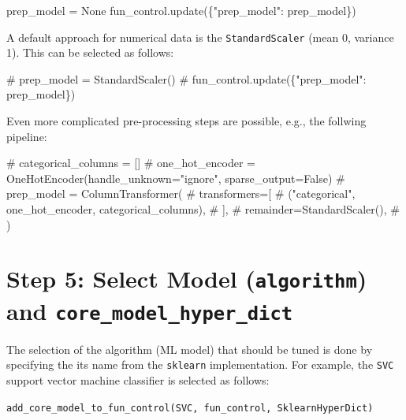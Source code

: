 \documentclass[
  letterpaper,
  DIV=11,
  numbers=noendperiod]{scrreprt}
\newenvironment{Shaded}{\begin{snugshade}}{\end{snugshade}}
\newcommand{\CommentTok}[1]{\textcolor[rgb]{0.37,0.37,0.37}{#1}}
\newcommand{\NormalTok}[1]{\textcolor[rgb]{0.00,0.23,0.31}{#1}}
\newcommand{\OperatorTok}[1]{\textcolor[rgb]{0.37,0.37,0.37}{#1}}
\newcommand{\StringTok}[1]{\textcolor[rgb]{0.13,0.47,0.30}{#1}}
\newcommand{\VariableTok}[1]{\textcolor[rgb]{0.07,0.07,0.07}{#1}}
\begin{document}
\begin{Shaded}
\begin{Highlighting}[]
\NormalTok{prep\_model }\OperatorTok{=} \VariableTok{None}
\NormalTok{fun\_control.update(\{}\StringTok{"prep\_model"}\NormalTok{: prep\_model\})}
\end{Highlighting}
\end{Shaded}

A default approach for numerical data is the \texttt{StandardScaler}
(mean 0, variance 1). This can be selected as follows:

\begin{Shaded}
\begin{Highlighting}[]
\CommentTok{\# prep\_model = StandardScaler()}
\CommentTok{\# fun\_control.update(\{"prep\_model": prep\_model\})}
\end{Highlighting}
\end{Shaded}

Even more complicated pre-processing steps are possible, e.g., the
follwing pipeline:

\begin{Shaded}
\begin{Highlighting}[]
\CommentTok{\# categorical\_columns = []}
\CommentTok{\# one\_hot\_encoder = OneHotEncoder(handle\_unknown="ignore", sparse\_output=False)}
\CommentTok{\# prep\_model = ColumnTransformer(}
\CommentTok{\#         transformers=[}
\CommentTok{\#             ("categorical", one\_hot\_encoder, categorical\_columns),}
\CommentTok{\#         ],}
\CommentTok{\#         remainder=StandardScaler(),}
\CommentTok{\#     )}
\end{Highlighting}
\end{Shaded}

\hypertarget{step-5-select-model-algorithm-and-core_model_hyper_dict-2}{%
\section{\texorpdfstring{Step 5: Select Model (\texttt{algorithm}) and
\texttt{core\_model\_hyper\_dict}}{Step 5: Select Model (algorithm) and core\_model\_hyper\_dict}}\label{step-5-select-model-algorithm-and-core_model_hyper_dict-2}}

The selection of the algorithm (ML model) that should be tuned is done
by specifying the its name from the \texttt{sklearn} implementation. For
example, the \texttt{SVC} support vector machine classifier is selected
as follows:

\texttt{add\_core\_model\_to\_fun\_control(SVC,\ fun\_control,\ SklearnHyperDict)}
\end{document}
